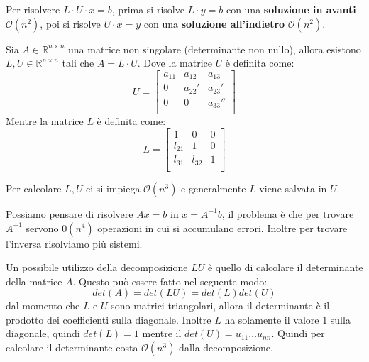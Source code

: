 Per risolvere $L\cdot U \cdot x =b$, prima si risolve $L\cdot y =b$ con una
\textbf{soluzione in avanti} $\mathcal{O}(n^2)$, poi si risolve $U \cdot x = y$
con una \textbf{soluzione all'indietro} $\mathcal{O}(n^2)$.
\begin{teorema}
    Sia $A \in \mathbb{R}^{n\times n}$ una matrice non singolare (determinante
    non nullo), allora esistono $L,U \in \mathbb{R}^{n\times n}$ tali che $A =
        L \cdot U$.
    Dove la matrice $U$ è definita come:
    \begin{equation*}
        U=\left[\begin{array}{ccc}
                a_{11} & a_{12}  & a_{13}   \\
                0      & a_{22}' & a_{23}'  \\
                0      & 0       & a_{33}'' \\
            \end{array}\right]
    \end{equation*}
    Mentre la matrice $L$ è definita come:
    \begin{equation*}
        L=\left[\begin{array}{ccc}
                1      & 0      & 0 \\
                l_{21} & 1      & 0 \\
                l_{31} & l_{32} & 1 \\
            \end{array}\right]
    \end{equation*}
\end{teorema}
Per calcolare $L,U$ ci si impiega $\mathcal{O}(n^3)$ e generalmente $L$ viene
salvata in $U$.
\begin{nota}
    Possiamo pensare di risolvere $Ax=b$ in $x= A^{-1}b$, il problema è che per
    trovare $A^{-1}$ servono $\mathcal{0}(n^4)$ operazioni in cui si accumulano
    errori. Inoltre per trovare l'inversa risolviamo più sistemi.
\end{nota}
\begin{nota}
    Un possibile utilizzo della decomposizione $LU$ è quello di calcolare il
    determinante della matrice $A$. Questo può essere fatto nel seguente modo:
    \begin{equation}
        det(A) = det(LU) = det(L)det(U)
    \end{equation}
    dal momento che $L$ e $U$ sono matrici triangolari, allora il determinante è
    il prodotto dei coefficienti sulla diagonale. Inoltre $L$ ha solamente il
    valore $1$ sulla diagonale, quindi $det(L) = 1$ mentre il $det(U) = u_{11}
        \dots u_{nn}$. Quindi per calcolare il determinante costa $\mathcal{O}(n^3)$
    dalla decomposizione.
\end{nota}

